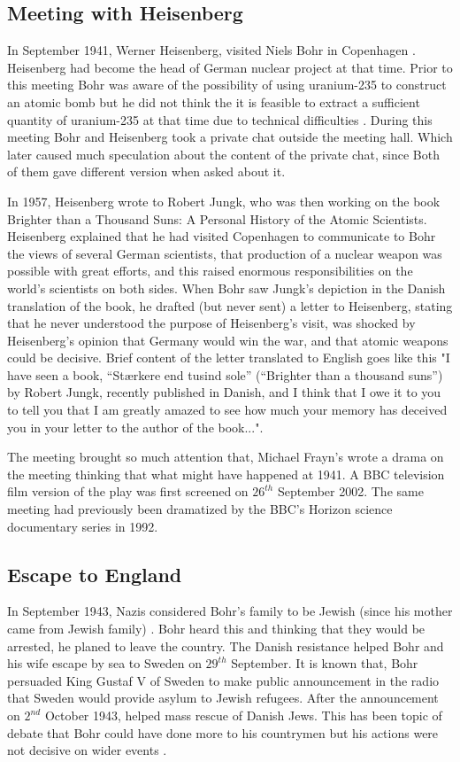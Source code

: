 \documentclass[11pt, article]{scrartcl}
\begin{document}
\subsection {Meeting with Heisenberg}
    In September 1941, Werner Heisenberg, visited Niels Bohr in Copenhagen \cite{bomb2}. Heisenberg had become the head of German nuclear
    project at that time. Prior to this meeting Bohr was aware of the possibility of using uranium-235 to construct an atomic bomb but he did 
    not think the it is feasible to extract a sufficient quantity of uranium-235 at that time due to technical difficulties \cite{war}. During this meeting
    Bohr and Heisenberg took a private chat outside the meeting hall. Which later caused much speculation about the content of the private chat,
    since Both of them gave different version when asked about it. 

    In 1957, Heisenberg wrote to Robert Jungk, who was then working on the book Brighter than a Thousand Suns: A Personal History of the Atomic
    Scientists. Heisenberg explained that he had visited Copenhagen to communicate to Bohr the views of several German scientists, that
    production of a nuclear weapon was possible with great efforts, and this raised enormous responsibilities on the world's scientists on both
    sides. When Bohr saw Jungk's depiction in the Danish translation of the book, he drafted (but never sent) a letter to Heisenberg\cite{archives}, stating
    that he never understood the purpose of Heisenberg's visit, was shocked by Heisenberg's opinion that Germany would win the war, and that
    atomic weapons could be decisive. Brief content of the letter translated to English goes like this "I have seen a book, “Stærkere end tusind
    sole” (“Brighter than a thousand suns”) by Robert Jungk, recently published in Danish, and I think that I owe it to you to tell you that I am
    greatly amazed to see how much your memory has deceived you in your letter to the author of the book...".

    The meeting brought so much attention that, Michael Frayn's wrote a drama on the meeting thinking that what might have happened at 1941\cite{drama}.
    A BBC television film version of the play was first screened on $26^{th}$ September 2002. The same meeting had previously been dramatized by the
    BBC's Horizon science documentary series in 1992.

\subsection {Escape to England}
    In September 1943, Nazis considered Bohr's family to be Jewish (since his mother came from Jewish family) \cite{war}. Bohr heard this and thinking that
    they would be arrested, he planed to leave the country. The Danish resistance helped Bohr and his wife escape by sea to Sweden on $29^{th}$
    September. It is known that, Bohr persuaded King Gustaf V of Sweden to make public announcement in the radio that Sweden would provide asylum
    to Jewish refugees. After the announcement on $2^{nd}$ October 1943, helped mass rescue of Danish Jews. This has been topic of debate that 
    Bohr could have done more to his countrymen but his actions were not decisive on wider events \cite{bomb2}. 
\end{document}
